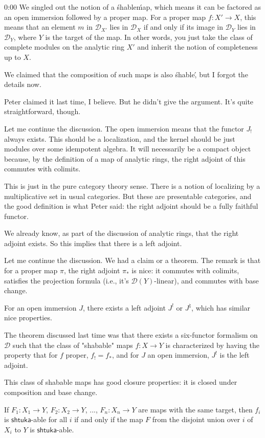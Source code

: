 \begin{unfinished}{0:00}
We singled out the notion of a \'shable\' map, which means it can be factored as an open immersion followed by a proper map. For a proper map $f: X' \to X$, this means that an element $m$ in $\mathcal{D}_{X'}$ lies in $\mathcal{D}_X$ if and only if its image in $\mathcal{D}_Y$ lies in $\mathcal{D}_Y$, where $Y$ is the target of the map. In other words, you just take the class of complete modules on the analytic ring $X'$ and inherit the notion of completeness up to $X$.

We claimed that the composition of such maps is also \'shable\', but I forgot the details now.

Peter claimed it last time, I believe. But he didn't give the argument. It's quite straightforward, though. 

Let me continue the discussion. The open immersion means that the functor $J_!$ always exists. This should be a localization, and the kernel should be just modules over some idempotent algebra. It will necessarily be a compact object because, by the definition of a map of analytic rings, the right adjoint of this commutes with colimits.

This is just in the pure category theory sense. There is a notion of localizing by a multiplicative set in usual categories. But these are presentable categories, and the good definition is what Peter said: the right adjoint should be a fully faithful functor.

We already know, as part of the discussion of analytic rings, that the right adjoint exists. So this implies that there is a left adjoint.

Let me continue the discussion. We had a claim or a theorem. The remark is that for a proper map $\pi$, the right adjoint $\pi_*$ is nice: it commutes with colimits, satisfies the projection formula (i.e., it's $\mathcal{D}(Y)$-linear), and commutes with base change.

For an open immersion $J$, there exists a left adjoint $J^!$ or $J^\natural$, which has similar nice properties.

The theorem discussed last time was that there exists a six-functor formalism on $\mathcal{D}$ such that the class of "shabable" maps $f: X \to Y$ is characterized by having the property that for $f$ proper, $f_! = f_*$, and for $J$ an open immersion, $J^!$ is the left adjoint.

This class of shabable maps has good closure properties: it is closed under composition and base change.


If $F_1: X_1 \to Y$, $F_2: X_2 \to Y$, ..., $F_n: X_n \to Y$ are maps with the same target, then $f_i$ is $\mathsf{shtuka}$-able for all $i$ if and only if the map $F$ from the disjoint union over $i$ of $X_i$ to $Y$ is $\mathsf{shtuka}$-able. 


\end{unfinished}

